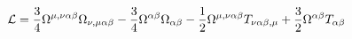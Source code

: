 \begin{equation}
{\cal L} = \frac{3}{4} \Omega^{\mu,\nu\alpha\beta}
\Omega_{\nu,\mu\alpha\beta} - \frac{3}{4} \Omega^{\alpha\beta}
\Omega_{\alpha\beta} - \frac{1}{2} \Omega^{\mu,\nu\alpha\beta}
T_{\nu\alpha\beta,\mu} + \frac{3}{2} \Omega^{\alpha\beta}
T_{\alpha\beta}
\end{equation}

